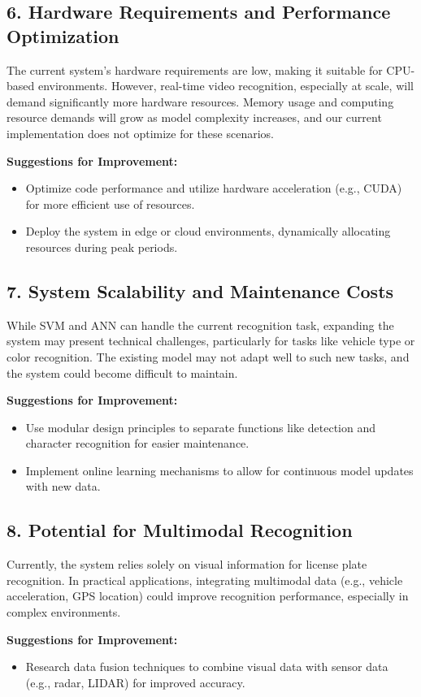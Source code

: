 \documentclass{article}
\begin{document}
	\subsection*{6. Hardware Requirements and Performance Optimization}
	
	The current system's hardware requirements are low, making it suitable for CPU-based environments. However, real-time video recognition, especially at scale, will demand significantly more hardware resources. Memory usage and computing resource demands will grow as model complexity increases, and our current implementation does not optimize for these scenarios.
	
	\textbf{Suggestions for Improvement:}
	\begin{itemize}
		\item Optimize code performance and utilize hardware acceleration (e.g., CUDA) for more efficient use of resources.
		\item Deploy the system in edge or cloud environments, dynamically allocating resources during peak periods.
	\end{itemize}
	
	\subsection*{7. System Scalability and Maintenance Costs}
	
	While SVM and ANN can handle the current recognition task, expanding the system may present technical challenges, particularly for tasks like vehicle type or color recognition. The existing model may not adapt well to such new tasks, and the system could become difficult to maintain.
	
	\textbf{Suggestions for Improvement:}
	\begin{itemize}
		\item Use modular design principles to separate functions like detection and character recognition for easier maintenance.
		\item Implement online learning mechanisms to allow for continuous model updates with new data.
	\end{itemize}
	
	\subsection*{8. Potential for Multimodal Recognition}
	
	Currently, the system relies solely on visual information for license plate recognition. In practical applications, integrating multimodal data (e.g., vehicle acceleration, GPS location) could improve recognition performance, especially in complex environments.
	
	\textbf{Suggestions for Improvement:}
	\begin{itemize}
		\item Research data fusion techniques to combine visual data with sensor data (e.g., radar, LIDAR) for improved accuracy.
	\end{itemize}
\end{document}
